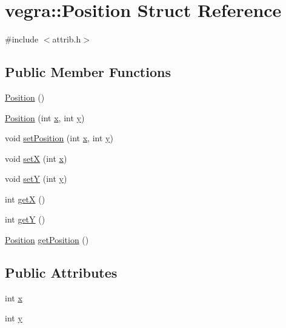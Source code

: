 \hypertarget{structvegra_1_1Position}{}\section{vegra\+:\+:Position Struct Reference}
\label{structvegra_1_1Position}


{\ttfamily \#include $<$attrib.\+h$>$}

\subsection*{Public Member Functions}
\begin{DoxyCompactItemize}
\item 
\mbox{\hyperlink{structvegra_1_1Position_af937e1b394be37468bff14e58a3e4156}{Position}} ()
\item 
\mbox{\hyperlink{structvegra_1_1Position_acafc039da99be520366e838103022c0b}{Position}} (int \mbox{\hyperlink{structvegra_1_1Position_a458595c84391b5ae3bdc0c8d256706b6}{x}}, int \mbox{\hyperlink{structvegra_1_1Position_a2e90d89fd65b914fe6b6157c2d20d90c}{y}})
\item 
void \mbox{\hyperlink{structvegra_1_1Position_a6f5f33e280592cce1670b9558d24d8a8}{set\+Position}} (int \mbox{\hyperlink{structvegra_1_1Position_a458595c84391b5ae3bdc0c8d256706b6}{x}}, int \mbox{\hyperlink{structvegra_1_1Position_a2e90d89fd65b914fe6b6157c2d20d90c}{y}})
\item 
void \mbox{\hyperlink{structvegra_1_1Position_a2accdc2782f0a67a529633c2c2125fe7}{setX}} (int \mbox{\hyperlink{structvegra_1_1Position_a458595c84391b5ae3bdc0c8d256706b6}{x}})
\item 
void \mbox{\hyperlink{structvegra_1_1Position_a1930518a71651b723688490e3adbe196}{setY}} (int \mbox{\hyperlink{structvegra_1_1Position_a2e90d89fd65b914fe6b6157c2d20d90c}{y}})
\item 
int \mbox{\hyperlink{structvegra_1_1Position_a5c93cf166315938b531e879ad31cddd1}{getX}} ()
\item 
int \mbox{\hyperlink{structvegra_1_1Position_a4580e90a19e9b28d4abc6a67326dce7a}{getY}} ()
\item 
\mbox{\hyperlink{structvegra_1_1Position}{Position}} \mbox{\hyperlink{structvegra_1_1Position_ab62133cb12f5886577670ba8623b5e09}{get\+Position}} ()
\end{DoxyCompactItemize}
\subsection*{Public Attributes}
\begin{DoxyCompactItemize}
\item 
int \mbox{\hyperlink{structvegra_1_1Position_a458595c84391b5ae3bdc0c8d256706b6}{x}}
\item 
int \mbox{\hyperlink{structvegra_1_1Position_a2e90d89fd65b914fe6b6157c2d20d90c}{y}}
\end{DoxyCompactItemize}


